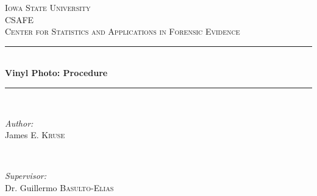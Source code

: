 \begin{titlepage}

\newcommand{\HRule}{\rule{\linewidth}{0.5mm}} %

\center %
 

\textsc{\LARGE Iowa State University}\\[1.5cm] %
\textsc{\Large CSAFE}\\[0.5cm] %
\textsc{\large Center for Statistics and Applications in Forensic Evidence }\\[0.5cm] %


\HRule \\[0.4cm]
{ \huge \bfseries Vinyl Photo: Procedure }\\[0.4cm] %
\HRule \\[1.5cm]
 

\begin{minipage}{0.4\textwidth}
\begin{flushleft} \large
\emph{Author:}\\
James \textsc{E. Kruse} %
\end{flushleft}
\end{minipage}
~
\begin{minipage}{0.4\textwidth}
\begin{flushright} \large
\emph{Supervisor:} \\
Dr. Guillermo \textsc{Basulto-Elias} %
\end{flushright}
\end{minipage}\\[2cm]


\end{titlepage}
